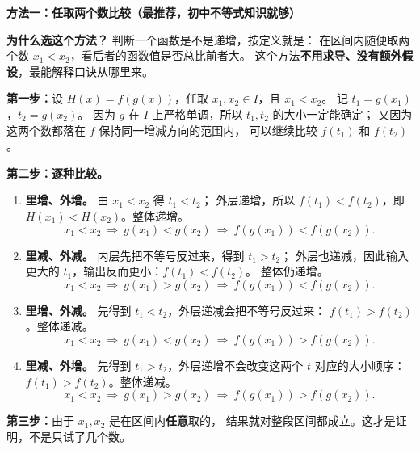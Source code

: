 \clearpage
\begin{proofbox}
\textbf{\textcolor{CProof}{方法一：任取两个数比较（最推荐，初中不等式知识就够）}}



\textbf{为什么选这个方法？} 判断一个函数是不是递增，按定义就是：
在区间内随便取两个数 $x_1<x_2$，看后者的函数值是否总比前者大。
这个方法\textbf{不用求导、没有额外假设}，最能解释口诀从哪里来。

\textbf{第一步：}设 $H(x)=f(g(x))$，任取 $x_1,x_2\in I$，且 $x_1<x_2$。
记 $t_1=g(x_1)$，$t_2=g(x_2)$。
因为 $g$ 在 $I$ 上严格单调，所以 $t_1,t_2$ 的大小一定能确定；
又因为这两个数都落在 $f$ 保持同一增减方向的范围内，
可以继续比较 $f(t_1)$ 和 $f(t_2)$。

\end{proofbox}
\clearpage
\begin{proofbox}
\textbf{第二步：逐种比较。}
\begin{enumerate}[leftmargin=*, itemsep=0.5em]
\item \textbf{里增、外增。} 由 $x_1<x_2$ 得 $t_1<t_2$；
外层递增，所以 $f(t_1)<f(t_2)$，即 $H(x_1)<H(x_2)$。整体递增。
\[
 x_1<x_2\ \Longrightarrow\ g(x_1)<g(x_2)
 \ \Longrightarrow\ f(g(x_1))<f(g(x_2)).
\]
\item \textbf{里减、外减。} 内层先把不等号反过来，得到 $t_1>t_2$；
外层也递减，因此输入更大的 $t_1$，输出反而更小：$f(t_1)<f(t_2)$。
整体仍递增。
\[
 x_1<x_2\ \Longrightarrow\ g(x_1)>g(x_2)
 \ \Longrightarrow\ f(g(x_1))<f(g(x_2)).
\]
\item \textbf{里增、外减。} 先得到 $t_1<t_2$，外层递减会把不等号反过来：
$f(t_1)>f(t_2)$。整体递减。
\[
 x_1<x_2\ \Longrightarrow\ g(x_1)<g(x_2)
 \ \Longrightarrow\ f(g(x_1))>f(g(x_2)).
\]
\item \textbf{里减、外增。} 先得到 $t_1>t_2$，外层递增不会改变这两个
$t$ 对应的大小顺序：$f(t_1)>f(t_2)$。整体递减。
\[
 x_1<x_2\ \Longrightarrow\ g(x_1)>g(x_2)
 \ \Longrightarrow\ f(g(x_1))>f(g(x_2)).
\]
\end{enumerate}
\textbf{第三步：}由于 $x_1,x_2$ 是在区间内\textbf{任意}取的，
结果就对整段区间都成立。这才是证明，不是只试了几个数。

\medskip
\end{proofbox}
\clearpage
